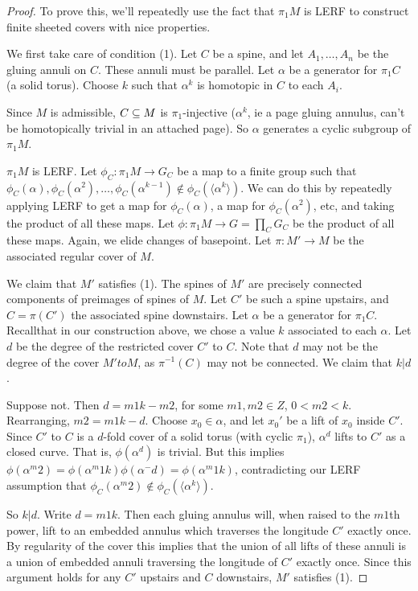 \begin{proof}

To prove this, we'll repeatedly use the fact that $\pi_1M$ is LERF to construct
finite sheeted covers with nice properties.

We first take care of condition (1). Let $C$ be a spine, and let
$A_1,\dots,A_n$ be the gluing annuli on $C$. These annuli must be parallel. Let
$\alpha$ be a generator for $\pi_1C$ (a solid torus). Choose $k$ such that
$\alpha^k$ is homotopic in $C$ to each $A_i$.

Since $M$ is admissible, $C \subseteq M$ is $\pi_1$-injective ($\alpha^k$, ie a page
gluing annulus, can't be homotopically trivial in an attached page). So $\alpha$
generates a cyclic subgroup of $\pi_1M$.

$\pi_1M$ is LERF. Let $\phi_C \colon \pi_1M \to G_C$ be a map to a finite group
such that $\phi_C(\alpha),\phi_C(\alpha^2),\dots,\phi_C(\alpha^{k-1}) \notin
\phi_C(\langle\alpha^k\rangle)$.  We can do this by repeatedly applying LERF to
get a map for $\phi_C(\alpha)$, a map for $\phi_C(\alpha^2)$, etc, and taking
the product of all these maps. Let $\phi \colon \pi_1M \to G = \prod_C G_C$  be
the product of all these maps.  Again, we elide changes of basepoint.  Let $\pi
\colon M' \to M$ be the associated regular cover of $M$.

We claim that $M'$ satisfies (1). The spines of $M'$ are precisely connected
components of preimages of spines of $M$. Let $C'$ be such a spine upstairs,
and $C=\pi(C')$ the associated spine downstairs. Let $\alpha$ be a generator
for $\pi_1C$.  Recallthat in our construction above, we chose a value $k$
associated to each $\alpha$. Let $d$ be the degree of the restricted cover $C'$
to $C$. Note that $d$ may not be the degree of the cover $M' to M$, as
$\pi^{-1}(C)$ may not be connected.  We claim that $k|d$.

Suppose not. Then $d = m1k - m2$, for some $m1,m2 \in Z$, $0 < m2 < k$.
Rearranging, $m2 = m1k - d$. Choose $x_0 \in \alpha$, and let $x_0'$ be a lift of
$x_0$ inside $C'$. Since $C'$ to $C$ is a $d$-fold cover of a solid torus (with
cyclic $\pi_1$), $\alpha^d$ lifts to $C'$ as a closed curve. That is,
$\phi(\alpha^d)$ is trivial.  But this implies $\phi(\alpha^m2)
= \phi(\alpha^m1k)\phi(\alpha^-d) = \phi(\alpha^m1k)$, contradicting our LERF
assumption that $\phi_C(\alpha^m2) \notin \phi_C(\langle\alpha^k\rangle)$.

So $k|d$. Write $d = m1k$. Then each gluing annulus will, when raised to the
$m1$th power, lift to an embedded annulus which traverses the longitude $C'$
exactly once.  By regularity of the cover this implies that the union of all
lifts of these annuli is a union of embedded annuli traversing the longitude of
$C'$ exactly once. Since this argument holds for any $C'$ upstairs and $C$
downstairs, $M'$ satisfies (1).


\end{proof}
